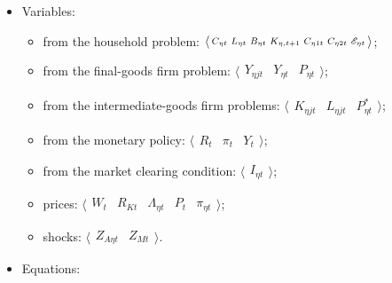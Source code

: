 \documentclass[
thesis.tex
]{subfiles}
\begin{document}
{\singlespacing
	
	\begin{itemize}

		\item Variables:
		
	\begin{itemize}
	
		\item from the household problem: $\langle \begin{smallmatrix} C_{\eta t} & L_{\eta t} & B_{\eta t} & K_{\eta, t+1} & C_{\eta 1t} & C_{\eta 2t} & {\mathscr{E}_{\eta t}} \end{smallmatrix} \rangle$;

		\item from the final-goods firm problem: $\langle \begin{smallmatrix} Y_{\eta jt} & Y_{\eta t} & P_{\eta t} \end{smallmatrix} \rangle$;

		\item from the intermediate-goods firm problems: $\langle \begin{smallmatrix} K_{\eta jt} & L_{\eta jt} & P_{\eta t}^{\ast} \end{smallmatrix} \rangle$;
		
		\item from the monetary policy: $\langle \begin{smallmatrix} R_{t} & \pi_{t} & Y_{t} \end{smallmatrix} \rangle$;
		
		\item from the market clearing condition: $\langle \begin{smallmatrix} I_{\eta t} \end{smallmatrix} \rangle$;
		
		\item prices: $\langle \begin{smallmatrix} W_{t} & R_{Kt} & \Lambda_{\eta t} & P_{t} & \pi_{\eta t} \end{smallmatrix} \rangle$;
		
		\item shocks: $\langle \begin{smallmatrix} Z_{A\eta t} & Z_{Mt} \end{smallmatrix} \rangle$.

	\end{itemize}

		\item Equations:
		

\end{itemize}}
\end{document}
